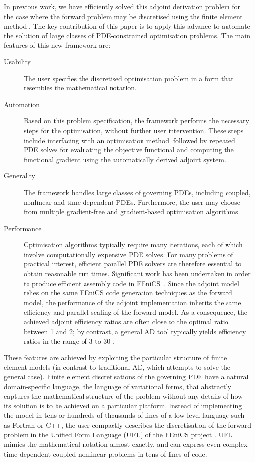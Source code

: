 \documentclass[prodmode,acmtoms]{acmsmall}
\newcommand{\fenics}{{\mbox{FEniCS}}\xspace}
\begin{document}
In previous work, we have efficiently solved this adjoint derivation problem for the case where the
forward problem may be discretised using the finite element method \cite{farrell2012}. The key contribution of
this paper is to apply this advance to automate the solution of large classes of
PDE-constrained optimisation problems.
The main features of this new framework are:
\begin{description}
 \item[Usability] The user specifies the discretised optimisation problem in a form that resembles the mathematical notation. 
 \item[Automation] Based on this problem specification, the framework performs the necessary steps for the optimisation, without further user intervention.
These steps include interfacing with an optimisation method, followed by repeated PDE solves for
evaluating the objective functional and computing the functional gradient using the automatically derived adjoint system.
\item[Generality] The framework handles large classes of governing PDEs, including coupled, nonlinear and time-dependent PDEs.
Furthermore, the user may choose from multiple gradient-free and gradient-based optimisation algorithms.
 \item[Performance] Optimisation algorithms typically require many iterations, each of which involve computationally expensive PDE solves.
For many problems of practical interest, efficient parallel PDE solvers are therefore essential to
obtain reasonable run times. 
Significant work has been undertaken in order to produce efficient assembly code in \fenics~\cite{kirby2007b,markall2012,olgaard2010}.
Since the adjoint model relies on the same \fenics code generation techniques as the forward model, 
the performance of the adjoint implementation inherits the same efficiency and parallel scaling of the forward model.
As a consequence, the achieved adjoint efficiency ratios are often close to the optimal ratio between 1 and 2; by
contrast, a general AD tool typically yields efficiency ratios in the range of 3 to 30 \cite[pg. \emph{xi}]{naumann2011}.
\end{description}
These features are achieved by exploiting the particular structure of finite element models (in
contrast to traditional AD, which attempts to solve the general case). Finite element discretisations of the
governing PDE have a natural domain-specific language, the language of variational forms, that
abstractly captures the mathematical structure of the problem without any details of how its
solution is to be achieved on a particular platform.  Instead of implementing the model in tens or
hundreds of thousands of lines of a low-level language such as Fortran or C++, the user compactly
describes the discretisation of the forward problem in the Unified Form Language
(UFL) \cite{alnaes2011,alnaes2012} of the FEniCS project
\cite{logg2011}. UFL mimics the mathematical notation almost exactly, and can express even complex
time-dependent coupled nonlinear problems in tens of lines of code. 
\end{document}
